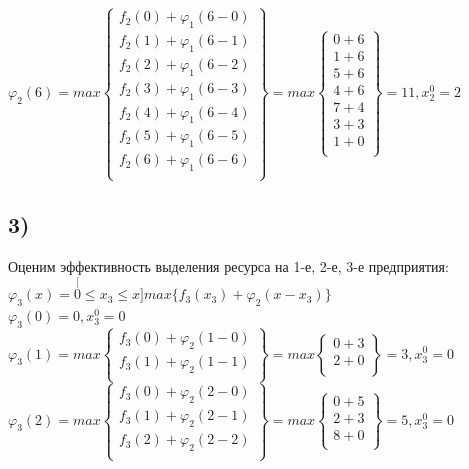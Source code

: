 $\varphi_2(6) = max \begin{Bmatrix}
    f_2(0) + \varphi_1(6 - 0) \\
    f_2(1) + \varphi_1(6 - 1) \\
    f_2(2) + \varphi_1(6 - 2) \\
    f_2(3) + \varphi_1(6 - 3) \\
    f_2(4) + \varphi_1(6 - 4) \\
    f_2(5) + \varphi_1(6 - 5) \\
    f_2(6) + \varphi_1(6 - 6) \\
\end{Bmatrix} = max \begin{Bmatrix}
    0 + 6 \\
    1 + 6 \\
    5 + 6 \\
    4 + 6 \\
    7 + 4 \\
    3 + 3 \\
    1 + 0 \\
\end{Bmatrix} = 11, x_2^0 = 2$\\


\subsection*{3)} Оценим эффективность выделения ресурса на 1-е, 2-е, 3-е предприятия:\\
$\varphi_3(x) = \stackrel[0 \le x_3 \le x]{}{max}  \{f_3(x_3) + \varphi_2(x - x_3)\}$\\

$\varphi_3(0) = 0, x_3^0 = 0$\\

$\varphi_3(1) = max \begin{Bmatrix}
    f_3(0) + \varphi_2(1 - 0) \\
    f_3(1) + \varphi_2(1 - 1) \\
\end{Bmatrix} = max \begin{Bmatrix}
    0 + 3 \\
    2 + 0 \\
\end{Bmatrix} = 3, x_3^0 = 0$\\

$\varphi_3(2) = max \begin{Bmatrix}
    f_3(0) + \varphi_2(2 - 0) \\
    f_3(1) + \varphi_2(2 - 1) \\
    f_3(2) + \varphi_2(2 - 2) \\
\end{Bmatrix} = max \begin{Bmatrix}
    0 + 5 \\
    2 + 3 \\
    8 + 0 \\
\end{Bmatrix} = 5, x_3^0 = 0$\\

